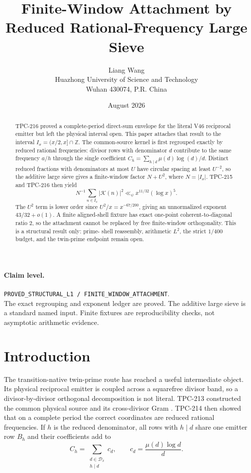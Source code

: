 \documentclass[11pt]{article}
\title{\textbf{Finite-Window Attachment by Reduced Rational-Frequency Large Sieve}}
\author{Liang Wang\\
Huazhong University of Science and Technology\\
Wuhan 430074, P.R. China}
\date{August 2026}
\theoremstyle{definition}
\theoremstyle{remark}
\newcommand{\Dx}{\mathcal D_x}
\newcommand{\Kphys}{\mathcal K}
\begin{document}
\maketitle

\begin{abstract}
TPC-216 proved a complete-period direct-sum envelope for the literal V46
reciprocal emitter but left the physical interval open.  This paper attaches
that result to the interval $I_x=(x/2,x]\cap\mathbb Z$.  The common-source
kernel is first regrouped exactly by reduced rational frequencies: divisor rows
with denominator $d$ contribute to the same frequency $a/h$ through the single
coefficient $C_h=\sum_{h\mid d}\mu(d)\log(d)/d$.  Distinct reduced fractions with
denominators at most $U$ have circular spacing at least $U^{-2}$, so the
additive large sieve gives a finite-window factor $N+U^2$, where
$N=|I_x|$.  TPC-215 and TPC-216 then yield
\[
 N^{-1}\sum_{n\in I_x}|\Kphys(n)|^2
 \ll_{\psi} x^{11/32}(\log x)^5.
\]
The $U^2$ term is lower order since $U^2/x=x^{-67/200}$, giving an
unnormalized exponent $43/32+o(1)$.  A finite aligned-shell fixture has exact
one-point coherent-to-diagonal ratio $2$, so the attachment cannot be replaced
by free finite-window orthogonality.  This is a structural result only: prime-
shell reassembly, arithmetic $L^2$, the strict $1/400$ budget, and the
twin-prime endpoint remain open.
\end{abstract}

\paragraph{Claim level.}
\texttt{PROVED\_STRUCTURAL\_L1 / FINITE\_WINDOW\_ATTACHMENT}.\\
The exact regrouping and exponent ledger are proved.  The additive large sieve
is a standard named input.  Finite fixtures are reproducibility checks, not
asymptotic arithmetic evidence.

\section{Introduction}

The transition-native twin-prime route has reached a useful intermediate
object.  Its physical reciprocal emitter is coupled across a squarefree divisor
band, so a divisor-by-divisor orthogonal decomposition is not literal.  TPC-213
constructed the common physical source and its cross-divisor Gram
\cite{WangV46,WangTPC214}.  TPC-214 then showed that on a complete period the
correct coordinates are reduced rational frequencies.  If $h$ is the reduced
denominator, all rows with $h\mid d$ share one emitter row $B_h$ and their
coefficients add to
\[
 C_h=\sum_{\substack{d\in\Dx\\h\mid d}} c_d,
 \qquad c_d=\frac{\mu(d)\log d}{d}.
\]
\end{document}
